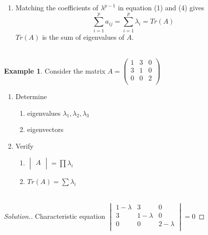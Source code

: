 \documentclass[11pt,a4paper]{article}
\theoremstyle{definition}
\newtheorem{exa}[thm]{Example}
\newenvironment{solution}
  {\renewcommand{\qedsymbol}{}\begin{proof}[\textit{Solution}.]}
  {\end{proof}}
\begin{document}
\begin{enumerate}
\item Matching the coefficients of $\lambda^{p-1}$ in equation (1) and (4) gives \begin{equation}\tag{6}
\sum^p_{i=1} a_{ij} = \sum^p_{i=1} \lambda_i = Tr(A)
\end{equation} $Tr(A)$ is the sum of eigenvalues of $A$.\\\\
\end{enumerate}



\begin{exa}
Consider the matrix $A = \begin{pmatrix}
1 & 3 & 0 \\
3 & 1 & 0\\
0 & 0 & 2\\
\end{pmatrix}$
\end{exa}


\begin{enumerate}
\item Determine
\begin{enumerate}
        \item eigenvalues $\lambda_1, \lambda_2, \lambda_3$
        
        \item eigenvectors
\end{enumerate}

\item Verify
\begin{enumerate}
     \item $\begin{vmatrix}
     A\\
     \end{vmatrix} = \prod \lambda_i$
     
     \item $Tr(A) = \sum \lambda_i$\\\\
\end{enumerate}
\end{enumerate}



\begin{solution}
Characteristic equation $\begin{vmatrix}
1-\lambda & 3 & 0 \\
3 & 1 -\lambda & 0\\
0 & 0 & 2-\lambda\\
\end{vmatrix}=0$
\end{solution}
\end{document}
